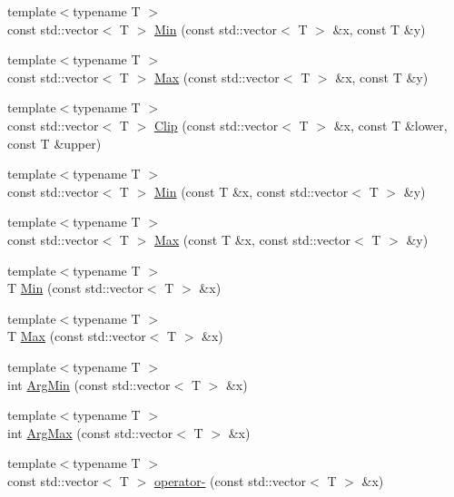 \begin{DoxyCompactItemize}
\item 
{\footnotesize template$<$typename T $>$ }\\const std\+::vector$<$ T $>$ \hyperlink{namespace_c_o_n_t_r_a_l_i_g_n_a6b53b3062ca847fb117cf013785f8100}{Min} (const std\+::vector$<$ T $>$ \&x, const T \&y)
\item 
{\footnotesize template$<$typename T $>$ }\\const std\+::vector$<$ T $>$ \hyperlink{namespace_c_o_n_t_r_a_l_i_g_n_a6c722fe0306d541389530e375d74ccdf}{Max} (const std\+::vector$<$ T $>$ \&x, const T \&y)
\item 
{\footnotesize template$<$typename T $>$ }\\const std\+::vector$<$ T $>$ \hyperlink{namespace_c_o_n_t_r_a_l_i_g_n_adf2697aa2857fa99795263160b364d3a}{Clip} (const std\+::vector$<$ T $>$ \&x, const T \&lower, const T \&upper)
\item 
{\footnotesize template$<$typename T $>$ }\\const std\+::vector$<$ T $>$ \hyperlink{namespace_c_o_n_t_r_a_l_i_g_n_a29e5e02d8c9a594a18989dd70a67d960}{Min} (const T \&x, const std\+::vector$<$ T $>$ \&y)
\item 
{\footnotesize template$<$typename T $>$ }\\const std\+::vector$<$ T $>$ \hyperlink{namespace_c_o_n_t_r_a_l_i_g_n_a5cc9c10aa252a488e82c2bb32c183747}{Max} (const T \&x, const std\+::vector$<$ T $>$ \&y)
\item 
{\footnotesize template$<$typename T $>$ }\\T \hyperlink{namespace_c_o_n_t_r_a_l_i_g_n_a1b53d2a84cfba4108bb7beb5270fe1c1}{Min} (const std\+::vector$<$ T $>$ \&x)
\item 
{\footnotesize template$<$typename T $>$ }\\T \hyperlink{namespace_c_o_n_t_r_a_l_i_g_n_a7a9aa6d2e9f21b56e04c47dc9bda0a12}{Max} (const std\+::vector$<$ T $>$ \&x)
\item 
{\footnotesize template$<$typename T $>$ }\\int \hyperlink{namespace_c_o_n_t_r_a_l_i_g_n_ab012f896d978a3dffc160298b00000be}{Arg\+Min} (const std\+::vector$<$ T $>$ \&x)
\item 
{\footnotesize template$<$typename T $>$ }\\int \hyperlink{namespace_c_o_n_t_r_a_l_i_g_n_a00dc218b758ac62148b43b448dc0c1c2}{Arg\+Max} (const std\+::vector$<$ T $>$ \&x)
\item 
{\footnotesize template$<$typename T $>$ }\\const std\+::vector$<$ T $>$ \hyperlink{namespace_c_o_n_t_r_a_l_i_g_n_a0dde76d72fb93b92bcf6bdcafbc435ba}{operator-\/} (const std\+::vector$<$ T $>$ \&x)

\end{DoxyCompactItemize}
